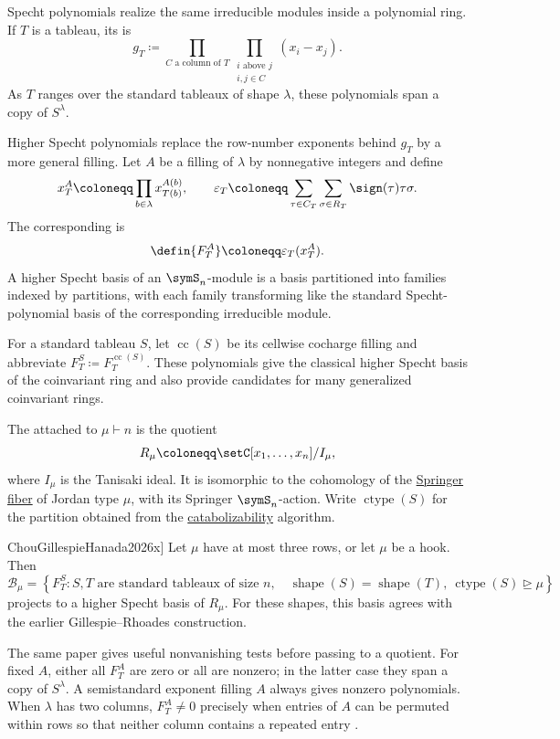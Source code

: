 Specht polynomials realize the same irreducible modules inside a polynomial
ring.  If $T$ is a tableau, its  is
\[
  g_T
  \coloneqq
  \prod_{C\text{ a column of }T}
  \prod_{\substack{i\text{ above }j\\i,j\in C}}(x_i-x_j).
\]
As $T$ ranges over the standard tableaux of shape $\lambda$, these
polynomials span a copy of $S^\lambda$.

Higher Specht polynomials replace the row-number exponents behind $g_T$ by a
more general filling.  Let $A$ be a filling of $\lambda$ by nonnegative
integers and define
\[
  x_T^A\coloneqq\prod_{b\in\lambda}x_{T(b)}^{A(b)},
  \qquad
  \varepsilon_T
  \coloneqq
  \sum_{\tau\in C_T}\sum_{\sigma\in R_T}
  \sign(\tau)\tau\sigma.
\]
The corresponding  is
\[
  \defin{F_T^A}\coloneqq\varepsilon_T(x_T^A).
\]
A higher Specht basis of an $\symS_n$-module is a basis partitioned into
families indexed by partitions, with each family transforming like the
standard Specht-polynomial basis of the corresponding irreducible module.

For a standard tableau $S$, let $\operatorname{cc}(S)$ be its cellwise
cocharge filling and abbreviate
$F_T^S\coloneqq F_T^{\operatorname{cc}(S)}$.  These polynomials give the
classical higher Specht basis of the coinvariant ring and also provide
candidates for many generalized coinvariant rings.

The  attached to $\mu\vdash n$ is the quotient
\[
  R_\mu\coloneqq\setC[x_1,\dotsc,x_n]/I_\mu,
\]
where $I_\mu$ is the Tanisaki ideal.  It is isomorphic to the cohomology of
the \hyperref[springerFibers]{Springer fiber} of Jordan type $\mu$, with its
Springer $\symS_n$-action.  Write $\operatorname{ctype}(S)$ for the partition
obtained from the \hyperref[catabolism]{catabolizability} algorithm.

\begin{theorem}[Chou--Gillespie--Hanada,
\cite[Thm.~1.4]{ChouGillespieHanada2026x}]
Let $\mu$ have at most three rows, or let $\mu$ be a hook.  Then
\[
  \mathcal B_\mu
  =
  \left\{F_T^S:
  S,T\text{ are standard tableaux of size }n,\quad
  \operatorname{shape}(S)=\operatorname{shape}(T),\
  \operatorname{ctype}(S)\trianglerighteq\mu\right\}
\]
projects to a higher Specht basis of $R_\mu$.  For these shapes, this basis
agrees with the earlier Gillespie--Rhoades construction.
\end{theorem}

The same paper gives useful nonvanishing tests before passing to a quotient.
For fixed $A$, either all $F_T^A$ are zero or all are nonzero; in the latter
case they span a copy of $S^\lambda$.  A semistandard exponent filling $A$
always gives nonzero polynomials.  When $\lambda$ has two columns,
$F_T^A\neq0$ precisely when entries of $A$ can be permuted within rows so
that neither column contains a repeated entry
\cite[Prop.~1.6, Cor.~1.14, Prop.~3.26]{ChouGillespieHanada2026x}.

